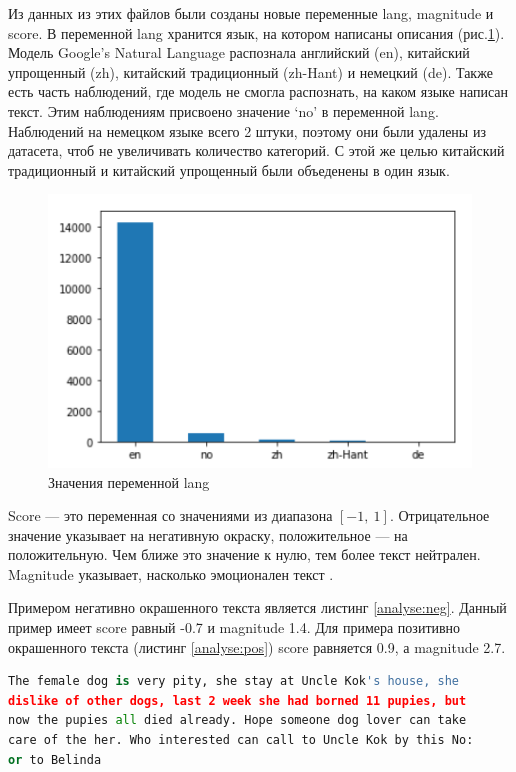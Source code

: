 \documentclass[14pt]{mmcs_article}
\begin{document}
Из данных из этих файлов были созданы новые переменные lang, magnitude и score. В переменной lang хранится язык, на котором написаны описания (рис.\ref{analyse:lang}). Модель Google’s Natural Language распознала английский (en), китайский упрощенный (zh), китайский традиционный (zh-Hant) и немецкий (de). Также есть часть наблюдений, где модель не смогла распознать, на каком языке написан текст. Этим наблюдениям присвоено значение `no' в переменной lang. Наблюдений на немецком языке всего 2 штуки, поэтому они были удалены из датасета, чтоб не увеличивать количество категорий. С этой же целью китайский традиционный и китайский упрощенный были объеденены в один язык. 

\begin{figure}[H]
	\centering
	\includegraphics[scale=1.2]{lang.png}
	\caption{Значения переменной lang}\label{analyse:lang}
\end{figure}

Score --- это переменная со значениями из диапазона $[-1,\ 1]$. Отрицательное значение указывает на негативную окраску, положительное --- на положительную. Чем ближе это значение к нулю, тем более текст нейтрален. Magnitude указывает, насколько эмоционален текст \cite{lib:googlelang}.

Примером негативно окрашенного текста является листинг \ref{analyse:neg}. Данный пример имеет score равный -0.7 и magnitude 1.4. Для примера позитивно окрашенного текста (листинг \ref{analyse:pos}) score равняется 0.9, а magnitude 2.7. 

\begin{lstlisting}[language=Python, caption={Пример негативно окрашенного текста}, label=analyse:neg]
The female dog is very pity, she stay at Uncle Kok's house, she 
dislike of other dogs, last 2 week she had borned 11 pupies, but 
now the pupies all died already. Hope someone dog lover can take 
care of the her. Who interested can call to Uncle Kok by this No: 
or to Belinda
\end{lstlisting}
\end{document}
